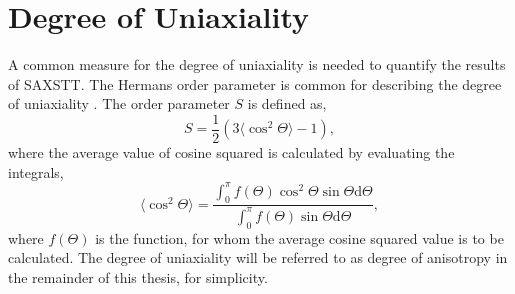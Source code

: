 \section{Degree of Uniaxiality} %

A common measure for the degree of uniaxiality is needed to quantify the results of SAXSTT.
The Hermans order parameter is common for describing the degree of uniaxiality \cite{yoshiharu1997cellulose}.
The order parameter $S$ is defined as,
\begin{equation}\label{eq:hermans_order_parameter}
    S = \frac{1}{2} \left( 3 \langle\cos^{2} \Theta\rangle - 1 \right),
\end{equation}
where the average value of cosine squared is calculated by evaluating the integrals,
\begin{equation}
    \langle\cos^{2} \Theta\rangle = \frac{ \int_{0}^{\pi} f (\Theta) \cos^{2} \Theta \sin \Theta  \mathrm{d}\Theta  }
    {\int_{0}^{\pi} f (\Theta) \sin \Theta  \mathrm{d}\Theta },
\end{equation}
\noindent
where $f(\Theta)$ is the function, for whom the average cosine squared value is to be calculated.
The degree of uniaxiality will be referred to as degree of anisotropy in the remainder of this thesis, for simplicity.

